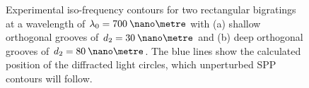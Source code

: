 \begin{figure}
\begin{center}
\end{center}
\caption[Experimental iso-frequency contours for two rectangular bigratings at a wavelength of $\lambda_0=700\:\nano\metre$.]{Experimental iso-frequency contours for two rectangular bigratings at a wavelength of $\lambda_0=700\:\nano\metre$ with (a) shallow orthogonal grooves of $d_2=30\:\nano\metre$ and (b) deep orthogonal grooves of $d_2=80\:\nano\metre$. The blue lines show the calculated position of the diffracted light circles, which unperturbed SPP contours will follow.  \label{fig:rectscattFlatteneing}}
\end{figure}

